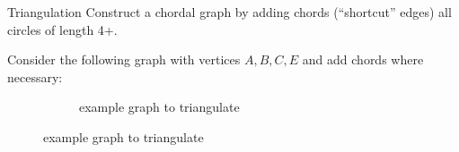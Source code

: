 \begin{frame}\frametitle{\subsubsecname}

\begin{block}{Triangulation}
Construct a chordal graph by adding chords (``shortcut'' edges) all circles of length 4+.
\end{block} 

Consider the following graph with vertices $A,B,C,E$ and add chords where necessary:\\


		\begin{figure}[h]
		 \centering
		 \begin{subfigure}[t]{0.35\textwidth}
			 \centering
			 \usebox{\imagebox}%
			 \caption{example graph to triangulate}
		 \end{subfigure}
		 \hspace{7mm}
		\end{figure}

\end{frame}


